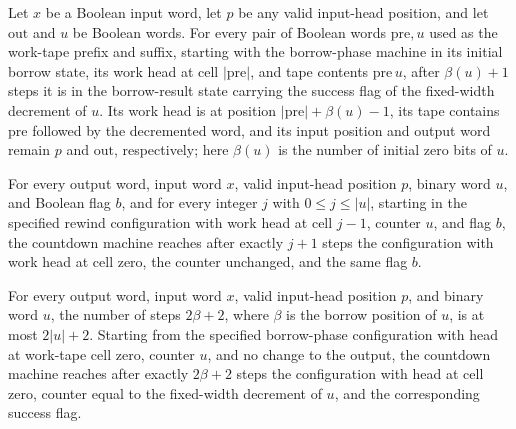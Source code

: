 \begin{lemma}
\label{Complexity.a2Borrow_run}
\leanok
{}
Let $x$ be a Boolean input word, let $p$ be any valid input-head position, and let
$\mathrm{out}$ and $u$ be Boolean words. For every pair of Boolean words
$\mathrm{pre},u$ used as the work-tape prefix and suffix, starting with the borrow-phase
machine in its initial borrow state, its work head at cell $|\mathrm{pre}|$, and tape
contents $\mathrm{pre}\,u$, after $\beta(u)+1$ steps it is in the borrow-result state
carrying the success flag of the fixed-width decrement of $u$. Its work head is at
position $|\mathrm{pre}|+\beta(u)-1$, its tape contains $\mathrm{pre}$ followed by the
decremented word, and its input position and output word remain $p$ and $\mathrm{out}$,
respectively; here $\beta(u)$ is the number of initial zero bits of $u$.
\end{lemma}

\begin{lemma}
\label{Complexity.a2Borrow_rewind}
\leanok
{}
For every output word, input word $x$, valid input-head position $p$, binary word $u$,
and Boolean flag $b$, and for every integer $j$ with $0\le j\le |u|$, starting in the
specified rewind configuration with work head at cell $j-1$, counter $u$, and flag $b$,
the countdown machine reaches after exactly $j+1$ steps the configuration with work head
at cell zero, the counter unchanged, and the same flag $b$.
\end{lemma}

\begin{lemma}
\label{Complexity.a2Borrow_correct}
\leanok
{}
For every output word, input word $x$, valid input-head position $p$, and binary word
$u$, the number of steps $2\beta+2$, where $\beta$ is the borrow position of $u$, is at
most $2|u|+2$. Starting from the specified borrow-phase configuration with head at
work-tape cell zero, counter $u$, and no change to the output, the countdown machine
reaches after exactly $2\beta+2$ steps the configuration with head at cell zero, counter
equal to the fixed-width decrement of $u$, and the corresponding success flag.
\end{lemma}


